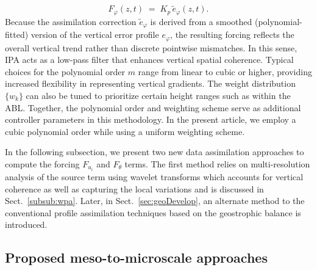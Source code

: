 \begin{equation}
  F_{\varphi}(z,t) \;=\; K_{p}\,\widetilde{e}_{\varphi}(z,t).
  \label{ipaForcing}
\end{equation}
%
Because the assimilation correction \(\widetilde{e}_{\varphi}\) is derived from a smoothed (polynomial-fitted) version of the vertical error profile $e_\varphi$, the resulting forcing reflects the overall vertical trend rather than discrete pointwise mismatches. In this sense, IPA acts as a low-pass filter that enhances vertical spatial coherence. Typical choices for the polynomial order \(m\) range from linear to cubic or higher, providing increased flexibility in representing vertical gradients. The weight distribution \(\{w_{k}\}\) can also be tuned to prioritize certain height ranges such as within the ABL. Together, the polynomial order and weighting scheme serve as additional controller parameters in this methodology. In the present article, we employ a cubic polynomial order while using a uniform weighting scheme.  

In the following subsection, we present two new data assimilation approaches to compute the forcing $F_{u_i}$ and $F_{\theta}$ terms. The first method relies on multi-resolution analysis of the source term using wavelet transforms which accounts for vertical coherence as well as capturing the local variations and is discussed in Sect.~\ref{subsub:wpa}. Later, in Sect.~\ref{sec:geoDevelop}, an alternate method to the conventional profile assimilation techniques based on the geostrophic balance is introduced. 

\subsection{\textbf{Proposed meso-to-microscale approaches}}
\label{sec:proposedPA}
